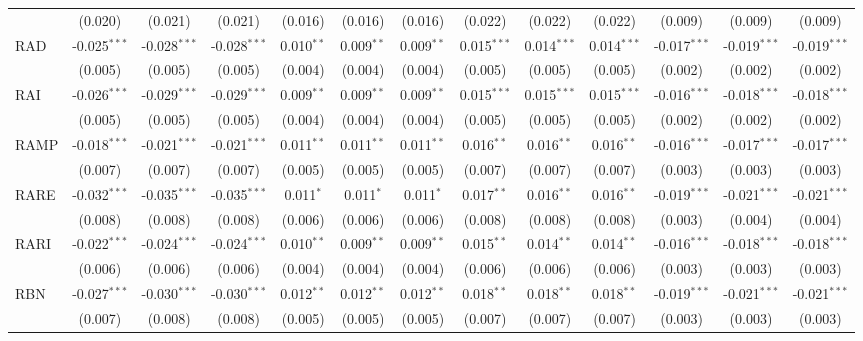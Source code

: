 \begin{table}[!htbp]
\begin{tabular}{@{\extracolsep{5pt}}lcccccccccccc}
  & (0.020) & (0.021) & (0.021) & (0.016) & (0.016) & (0.016) & (0.022) & (0.022) & (0.022) & (0.009) & (0.009) & (0.009) \\
 RAD & -0.025$^{***}$ & -0.028$^{***}$ & -0.028$^{***}$ & 0.010$^{**}$ & 0.009$^{**}$ & 0.009$^{**}$ & 0.015$^{***}$ & 0.014$^{***}$ & 0.014$^{***}$ & -0.017$^{***}$ & -0.019$^{***}$ & -0.019$^{***}$ \\
  & (0.005) & (0.005) & (0.005) & (0.004) & (0.004) & (0.004) & (0.005) & (0.005) & (0.005) & (0.002) & (0.002) & (0.002) \\
 RAI & -0.026$^{***}$ & -0.029$^{***}$ & -0.029$^{***}$ & 0.009$^{**}$ & 0.009$^{**}$ & 0.009$^{**}$ & 0.015$^{***}$ & 0.015$^{***}$ & 0.015$^{***}$ & -0.016$^{***}$ & -0.018$^{***}$ & -0.018$^{***}$ \\
  & (0.005) & (0.005) & (0.005) & (0.004) & (0.004) & (0.004) & (0.005) & (0.005) & (0.005) & (0.002) & (0.002) & (0.002) \\
 RAMP & -0.018$^{***}$ & -0.021$^{***}$ & -0.021$^{***}$ & 0.011$^{**}$ & 0.011$^{**}$ & 0.011$^{**}$ & 0.016$^{**}$ & 0.016$^{**}$ & 0.016$^{**}$ & -0.016$^{***}$ & -0.017$^{***}$ & -0.017$^{***}$ \\
  & (0.007) & (0.007) & (0.007) & (0.005) & (0.005) & (0.005) & (0.007) & (0.007) & (0.007) & (0.003) & (0.003) & (0.003) \\
 RARE & -0.032$^{***}$ & -0.035$^{***}$ & -0.035$^{***}$ & 0.011$^{*}$ & 0.011$^{*}$ & 0.011$^{*}$ & 0.017$^{**}$ & 0.016$^{**}$ & 0.016$^{**}$ & -0.019$^{***}$ & -0.021$^{***}$ & -0.021$^{***}$ \\
  & (0.008) & (0.008) & (0.008) & (0.006) & (0.006) & (0.006) & (0.008) & (0.008) & (0.008) & (0.003) & (0.004) & (0.004) \\
 RARI & -0.022$^{***}$ & -0.024$^{***}$ & -0.024$^{***}$ & 0.010$^{**}$ & 0.009$^{**}$ & 0.009$^{**}$ & 0.015$^{**}$ & 0.014$^{**}$ & 0.014$^{**}$ & -0.016$^{***}$ & -0.018$^{***}$ & -0.018$^{***}$ \\
  & (0.006) & (0.006) & (0.006) & (0.004) & (0.004) & (0.004) & (0.006) & (0.006) & (0.006) & (0.003) & (0.003) & (0.003) \\
 RBN & -0.027$^{***}$ & -0.030$^{***}$ & -0.030$^{***}$ & 0.012$^{**}$ & 0.012$^{**}$ & 0.012$^{**}$ & 0.018$^{**}$ & 0.018$^{**}$ & 0.018$^{**}$ & -0.019$^{***}$ & -0.021$^{***}$ & -0.021$^{***}$ \\
  & (0.007) & (0.008) & (0.008) & (0.005) & (0.005) & (0.005) & (0.007) & (0.007) & (0.007) & (0.003) & (0.003) & (0.003) \\

\end{tabular}
\end{table}
